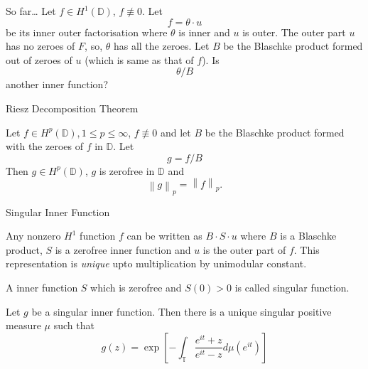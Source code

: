 \documentclass{beamer}
\numberwithin{equation}{subsection}
\newcommand{\D}{\mathbb D}
\newcommand{\T}{\mathbb T}
\newcommand{\norm}[1]{\left\lVert #1 \right\rVert}
\begin{document}
    \begin{frame}{So far\ldots}
	Let $f\in H^{1} \left( \D \right)$, $f\not \equiv 0$. Let
	\begin{equation*}
	    f=\theta \cdot u
	\end{equation*}
	be its inner outer factorisation where $\theta$ is inner and $u$ is outer.
	\pause
	The outer part $u$ has no zeroes of $F$, so, $\theta$ has all the zeroes.
	\pause
	Let $B$ be the Blaschke product formed out of zeroes of $u$ (which is same as that of $f$). Is
	\begin{equation*}
	    \theta /B
	\end{equation*}
	another inner function?
    \end{frame}
    \begin{frame}{Riesz Decomposition Theorem}
	\begin{theorem}
	    Let $f\in H^{p} \left( \D \right), 1\le p \le \infty$, $f\not \equiv 0$ and let $B$ be the Blaschke product formed with the zeroes of $f$ in $\D$. Let
	    \begin{equation*}
		g=f/B
	    \end{equation*}
	    Then $g\in H^{p} \left( \D \right)$, $g$ is zerofree in $\D$ and 
	    \begin{equation*}
		\norm{g}_{p} = \norm{f}_{p}.
	    \end{equation*}
	\end{theorem}
    \end{frame}

    \begin{frame}{Singular Inner Function}
	
\pause
Any nonzero $H^{1}$ function $f$ can be written as $B \cdot S \cdot u$ where $B$ is a Blaschke product, $S$ is a zerofree inner function and $u$ is the outer part of $f$. This representation is \textit{unique} upto multiplication by unimodular constant.

\pause

\begin{definition}
    A inner function $S$ which is zerofree and $S\left( 0 \right) > 0$ is called singular function.
\end{definition}
\pause

\begin{theorem}
    Let $g$ be a singular inner function. Then there is a unique singular positive measure $\mu$ such that 
    \begin{equation*}
	g\left( z \right) = \exp \left[ - \int_{\T} \frac{e^{it} + z}{e^{it} -z }d\mu \left( e^{it} \right) \right]
    \end{equation*}
\end{theorem}

    \end{frame}
\end{document}
